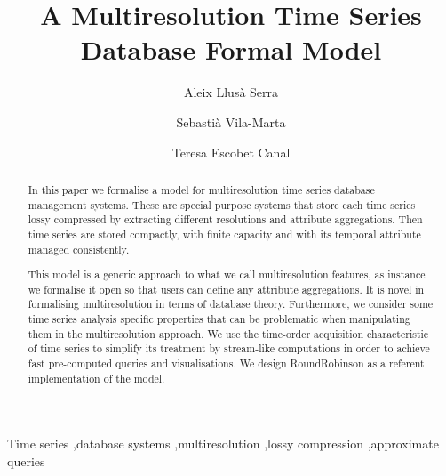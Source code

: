 \documentclass[
  review,
  twocolumn,
  5p,
  sort&compress,
]{elsarticle}
\begin{document}


\begin{frontmatter}

  \title{A Multiresolution Time Series \\ Database Formal Model}


  \author
  [dipse]
  {Aleix Llus\`{a} Serra
  }

  \author
  [dipse]
  {Sebasti\`{a} Vila-Marta
  }

  \author
  [dipse]
  {Teresa Escobet Canal
  }



  \address
  [dipse]
  {Department of Electronic System Design and Programming\\ Universitat Polit\`{e}cnica de Catalunya\\ Av.~Bases de Manresa 61--73, 08242 Manresa, ES-CT}



  \begin{abstract}
    In this paper we formalise a model for multiresolution time series
    database management systems. These are special purpose systems
    that store each time series lossy compressed by extracting
    different resolutions and attribute aggregations. Then time series
    are stored compactly, with finite capacity and with its temporal
    attribute managed consistently.

    
   
    This model is a generic approach to what we call multiresolution
    features, as instance we formalise it open so that users can
    define any attribute aggregations. It is novel in formalising
    multiresolution in terms of database theory. Furthermore, we
    consider some time series analysis specific properties that can be
    problematic when manipulating them in the multiresolution
    approach.  We use the time-order acquisition characteristic of
    time series to simplify its treatment by stream-like computations
    in order to achieve fast pre-computed queries and
    visualisations. We design RoundRobinson as a referent
    implementation of the model.





  \end{abstract}


  \begin{keyword}
    Time series \sep database systems \sep multiresolution \sep lossy
    compression \sep approximate queries
  \end{keyword}

\end{frontmatter}
\end{document}
